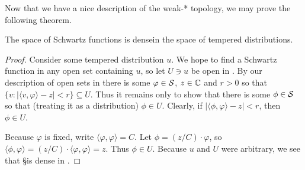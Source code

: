     Now that we have a nice description of the weak-* topology, we may prove the following theorem.
    \begin{thm}
      The space of Schwartz functions is dense\footnotemark in the space of tempered distributions.
    \end{thm}
    \begin{proof}
      Consider some tempered distribution $u$.
      We hope to find a Schwartz function in any open set containing $u$, so let $U\ni u$ be open in \SS.
      By our description of open sets in \SS there is some $\varphi\in\S$, $z\in\C$ and $r>0$ so that $\{v: |\langle v,\varphi\rangle-z|<r\}\subseteq U$.
      Thus it remains only to show that there is some $\phi\in\S$ so that (treating it as a distribution) $\phi\in U$.
      Clearly, if $|\langle\phi,\varphi\rangle-z|<r$, then $\phi\in U$.

      Because $\varphi$ is fixed, write $\langle\varphi,\varphi\rangle=C$.
      Let $\phi = (z/C)\cdot\varphi$, so $\langle\phi,\varphi\rangle = (z/C)\cdot\langle\varphi,\varphi\rangle = z$.
      Thus $\phi\in U$.  
      Because $u$ and $U$ were arbitrary, we see that \S is dense in \SS.
    \end{proof}


